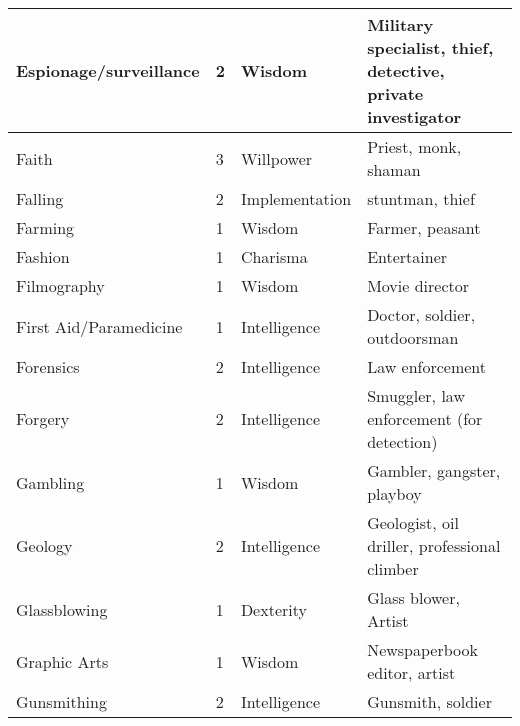 \documentclass[twoside]{book}
\begin{document}
\begin{longtable}{p{1.25in}llp{12em}}
  \raggedright
           Espionage/surveillance 
  &
   2 
  &
   Wisdom 
  &
   Military specialist,
           thief, detective, private investigator 
  \tabularnewline
  \hline
      
  \raggedright
           Faith 
  &
   3 
  &
   Willpower 
  &
   Priest, monk, shaman
           
  \tabularnewline
  \hline
      
  \raggedright
           Falling 
  &
   2 
  &
   Implementation 
  &
   stuntman, thief 
  \tabularnewline
  \hline
      
  \raggedright
           Farming 
  &
   1 
  &
   Wisdom 
  &
   Farmer, peasant 
  \tabularnewline
  \hline
      
  \raggedright
           Fashion 
  &
   1 
  &
   Charisma 
  &
   Entertainer 
  \tabularnewline
  \hline
      
  \raggedright
           Filmography 
  &
   1 
  &
   Wisdom 
  &
   Movie director 
  \tabularnewline
  \hline
      
  \raggedright
           First Aid/Paramedicine 
  &
   1 
  &
   Intelligence 
  &
   Doctor, soldier,
           outdoorsman 
  \tabularnewline
  \hline
      
  \raggedright
           Forensics 
  &
   2 
  &
   Intelligence 
  &
   Law enforcement 
  \tabularnewline
  \hline
      
  \raggedright
           Forgery 
  &
   2 
  &
   Intelligence 
  &
   Smuggler, law enforcement
           (for detection) 
  \tabularnewline
  \hline
      
  \raggedright
           Gambling 
  &
   1 
  &
   Wisdom 
  &
   Gambler, gangster,
           playboy 
  \tabularnewline
  \hline
      
  \raggedright
           Geology 
  &
   2 
  &
   Intelligence 
  &
   Geologist, oil driller,
           professional climber 
  \tabularnewline
  \hline
      
  \raggedright
           Glassblowing 
  &
   1 
  &
   Dexterity 
  &
   Glass blower, Artist
           
  \tabularnewline
  \hline
      
  \raggedright
           Graphic Arts 
  &
   1 
  &
   Wisdom 
  &
   Newspaperbook
           editor, artist 
  \tabularnewline
  \hline
      
  \raggedright
           Gunsmithing 
  &
   2 
  &
   Intelligence 
  &
   Gunsmith, soldier
           
  \tabularnewline
  \hline
      

\end{longtable}
\end{document}
